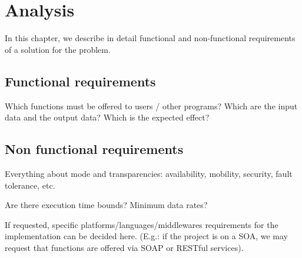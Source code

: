 \chapter{Analysis}\label{ch:analysis}

In this chapter, we describe in detail functional and non-functional requirements of a solution for the problem.

\section{Functional requirements}
Which functions must be offered to users / other programs?  Which are the input data and the output data? Which is the expected effect? 

\section{Non functional requirements}
Everything about mode and transparencies: availability, mobility, security, fault tolerance, etc.

Are there execution time bounds? Minimum data rates?

If requested, specific platforms/languages/middlewares requirements for the implementation can be decided here. (E.g.: if the project is on a SOA, we may request that functions are offered via SOAP or RESTful services). 
